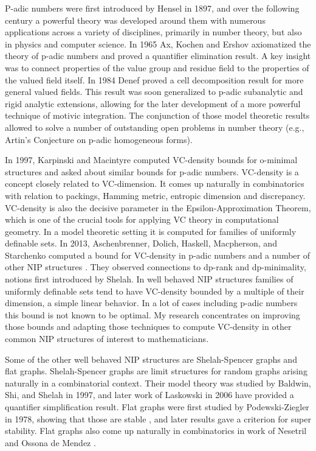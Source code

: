 P-adic numbers were first introduced by Hensel in 1897, and over the following century a powerful theory was developed around them with numerous applications across a variety of disciplines, primarily in number theory, but also in physics and computer science. In 1965 Ax, Kochen and Ershov axiomatized the theory of p-adic numbers and proved a quantifier elimination result. A key insight was to connect properties of the value group and residue field to the properties of the valued field itself. In 1984 Denef proved a cell decomposition result for more general valued fields. This result was soon generalized to p-adic subanalytic and rigid analytic extensions, allowing for the later development of a more powerful technique of motivic integration. The conjunction of those model theoretic results allowed to solve a number of outstanding open problems in number theory (e.g., Artin's Conjecture on p-adic homogeneous forms).

In 1997, Karpinski and Macintyre computed VC-density bounds for o-minimal structures and asked about similar bounds for p-adic numbers. VC-density is a concept closely related to VC-dimension. It comes up naturally in combinatorics with relation to packings, Hamming metric, entropic dimension and discrepancy.  VC-density is also the decisive parameter in the Epsilon-Approximation Theorem, which is one of the crucial tools for applying VC theory in computational geometry. In a model theoretic setting it is computed for families of uniformly definable sets.  In 2013, Aschenbrenner, Dolich, Haskell, Macpherson, and Starchenko computed a bound for VC-density in p-adic numbers and a number of other NIP structures \cite{density}. They observed connections to dp-rank and dp-minimality, notions first introduced by Shelah. In well behaved NIP structures families of uniformly definable sets tend to have VC-density bounded by a multiple of their dimension, a simple linear behavior. In a lot of cases including p-adic numbers this bound is not known to be optimal. My research concentrates on improving those bounds and adapting those techniques to compute VC-density in other common NIP structures of interest to mathematicians.

Some of the other well behaved NIP structures are Shelah-Spencer graphs and flat graphs. Shelah-Spencer graphs are limit structures for random graphs arising naturally in a combinatorial context. Their model theory was studied by Baldwin, Shi, and Shelah in 1997, and later work of Laskowski in 2006 \cite{laskowski} have provided a quantifier simplification result.  Flat graphs were first studied by Podewski-Ziegler in 1978, showing that those are stable \cite{stable_graphs}, and later results gave a criterion for super stability. Flat graphs also come up naturally in combinatorics in work of Nesetril and Ossona de Mendez \cite{nowhere}. %

